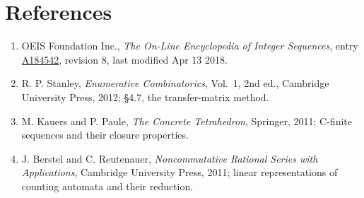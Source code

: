 \documentclass[11pt]{article}
\theoremstyle{definition}
\begin{document}
\section{References}

\begin{enumerate}

\item OEIS Foundation Inc., \emph{The On-Line Encyclopedia of Integer Sequences}, entry \href{https://oeis.org/A184542}{A184542}, revision 8, last modified Apr 13 2018.

\item R. P. Stanley, \emph{Enumerative Combinatorics}, Vol.~1, 2nd ed., Cambridge University Press, 2012; \S4.7, the transfer-matrix method.

\item M. Kauers and P. Paule, \emph{The Concrete Tetrahedron}, Springer, 2011; C-finite sequences and their closure properties.

\item J. Berstel and C. Reutenauer, \emph{Noncommutative Rational Series with Applications}, Cambridge University Press, 2011; linear representations of counting automata and their reduction.

\end{enumerate}
\end{document}
